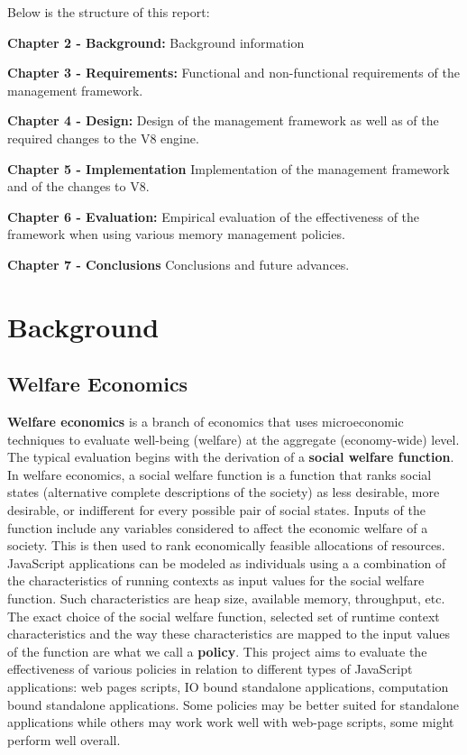 \documentclass{l4proj}
\begin{document}
Below is the structure of this report:

\textbf{Chapter 2 - Background:}
Background information

\textbf{Chapter 3 - Requirements:}
Functional and non-functional requirements of the management framework.

\textbf{Chapter 4 - Design:}
Design of the management framework as well as of the required changes to the V8 engine.

\textbf{Chapter 5 - Implementation}
Implementation of the management framework and of the changes to V8.

\textbf{Chapter 6 - Evaluation:}
Empirical evaluation of the effectiveness of the framework when using various memory management policies.

\textbf{Chapter 7 - Conclusions}
Conclusions and future advances.


\chapter{Background}
\section{Welfare Economics}
\hspace*{3em} \textbf{Welfare economics} is a branch of economics that uses microeconomic techniques to evaluate well-being (welfare) at the aggregate (economy-wide) level.\cite{welfareeconomics} The typical evaluation begins with the derivation of a \textbf{social welfare function}. In welfare economics, a social welfare function is a function that ranks social states (alternative complete descriptions of the society) as less desirable, more desirable, or indifferent for every possible pair of social states. Inputs of the function include any variables considered to affect the economic welfare of a society.\cite{socialwelfarefunction} This is then used to rank economically feasible allocations of resources. JavaScript applications can be modeled as individuals using a a combination of the characteristics of running contexts as input values for the social welfare function. Such characteristics are heap size, available memory, throughput, etc. The exact choice of the social welfare function, selected set of runtime context characteristics and the way these characteristics are mapped to the input values of the function are what we call a \textbf{policy}. This project aims to evaluate the effectiveness of various policies in relation to different types of JavaScript applications: web pages scripts, IO bound standalone applications, computation bound standalone applications. Some policies may be better suited for standalone applications while others may work work well with web-page scripts, some might perform well overall. 
\end{document}
